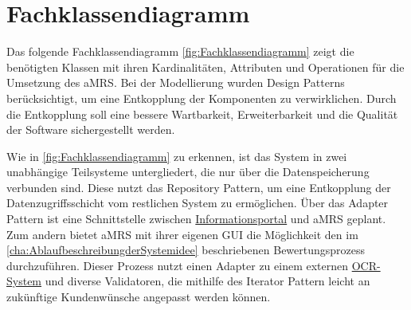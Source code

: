 \section{Fachklassendiagramm}

\noindent Das folgende Fachklassendiagramm \autoref{fig:Fachklassendiagramm} zeigt die benötigten Klassen mit ihren
Kardinalitäten, Attributen und Operationen für die Umsetzung des \ac{aMRS}. Bei der Modellierung wurden Design Patterns
berücksichtigt, um eine Entkopplung der Komponenten zu verwirklichen. Durch die Entkopplung soll eine bessere
Wartbarkeit, Erweiterbarkeit und die Qualität der Software sichergestellt werden. \newline

\noindent Wie in \autoref{fig:Fachklassendiagramm} zu erkennen, ist das System in zwei unabhängige Teilsysteme
untergliedert, die nur über die Datenspeicherung verbunden sind. Diese nutzt das Repository Pattern, um eine
Entkopplung der Datenzugriffsschicht vom restlichen System zu ermöglichen. Über das Adapter Pattern ist eine
Schnittstelle zwischen \hyperref[gls:informationsportal]{Informationsportal} und \ac{aMRS} geplant. Zum andern bietet \ac{aMRS} mit ihrer eigenen GUI die
Möglichkeit den im \autoref{cha:AblaufbeschreibungderSystemidee} beschriebenen Bewertungsprozess durchzuführen. Dieser Prozess nutzt einen Adapter
zu einem externen \hyperref[gls:ocr-System]{OCR-System} und diverse Validatoren, die mithilfe des Iterator Pattern leicht an zukünftige
Kundenwünsche angepasst werden können.

\newpage

